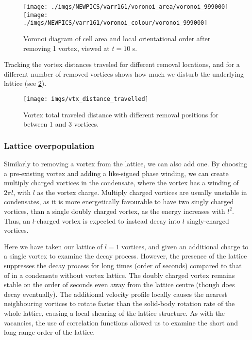 \begin{figure}[tb]
    \texttt{[image: ./imgs/NEWPICS/varr161/voronoi\_area/voronoi\_999000]}
    \texttt{[image: ./imgs/NEWPICS/varr161/voronoi\_colour/voronoi\_999000]}
    \caption{Voronoi diagram of cell area and local orientational order after removing 1 vortex, viewed at $t=10$ s.}\label{fig:voronoi_1vtx}
\end{figure}


Tracking the vortex distances traveled for different removal locations, and for a different number of removed vortices shows how much we
disturb the underlying lattice (see \ref{fig:vtxdist}).

\begin{figure}[tb]
	\texttt{[image: imgs/vtx\_distance\_travelled]}
	\caption{Vortex total traveled distance with different removal positions for between 1 and 3 vortices.}
	\label{fig:vtxdist}
\end{figure}


\subsubsection{Lattice overpopulation}
Similarly to removing a vortex from the lattice, we can also add one. By choosing a pre-existing vortex and adding a like-signed phase
winding, we can create multiply charged vortices in the condensate, where the vortex has a winding of $2\pi l$, with $l$ as the vortex
charge. Multiply charged vortices are usually unstable in condensates, as it is more energetically favourable to have two singly charged
vortices, than a single doubly charged vortex, as the energy increases with $l^2$. Thus, an $l$-charged vortex is expected to instead decay
into $l$ singly-charged vortices.

Here we have taken our lattice of $l=1$ vortices, and given an additional charge to a single vortex to examine the decay process. However,
the presence of the lattice suppresses the decay process for long times (order of seconds) compared to that of in a condensate without vortex
lattice. The doubly charged vortex remains stable on the order of seconds even away from the lattice centre (though does decay eventually).
The additional velocity profile locally causes the nearest neighbouring vortices to rotate faster than the solid-body rotation rate of the
whole lattice, causing a local shearing of the lattice structure. As with the vacancies, the use of correlation functions allowed us to
examine the short and long-range order of the lattice.

